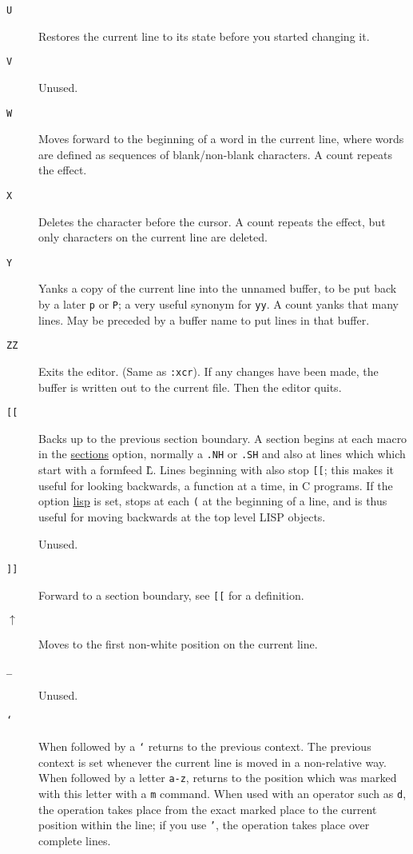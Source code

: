 \begin{description}
\item[{\tt U}] Restores the current line to its state before you started
changing it.

\item[{\tt V}] Unused.

\item[{\tt W}] Moves forward to the beginning of a word in the current line,
where words are defined as sequences of blank/non-blank characters. A count
repeats the effect.

\item[{\tt X}] Deletes the character before the cursor. A count repeats the
effect, but only characters on the current line are deleted.

\item[{\tt Y}] Yanks a copy of the current line into the unnamed buffer, to be
put back by a later {\tt p} or {\tt P}; a very useful synonym for {\tt yy}. A
count yanks that many lines. May be preceded by a buffer name to put lines in
that buffer.

\item[{\tt ZZ}] Exits the editor. (Same as {\tt :x\sc cr}). If any changes
have been made, the buffer is written out to the current file. Then the editor
quits.

\item[{\tt [[}] Backs up to the previous section boundary. A section begins at
each macro in the \ul{sections} option, normally a {\tt.NH} or {\tt.SH} and
also at lines which which start with a formfeed \^{L}.  Lines beginning with
{\tt{}} also stop {\tt [[}; this makes it useful for looking
backwards, a function at a time, in C programs. If the option \ul{lisp} is
set, stops at each {\tt (} at the beginning of a line, and is thus useful for
moving backwards at the top level LISP objects.

\item[{\tt{}}] Unused.

\item[{\tt ]]}] Forward to a section boundary, see {\tt [[} for a definition.

\item[{\tt $\uparrow$}] Moves to the first non-white position on the current
line.

\item[{\tt\_}] Unused.

\item[{\tt `}] When followed by a {\tt `} returns to the previous context. The
previous context is set whenever the current line is moved in a non-relative
way. When followed by a letter {\tt a-z}, returns to the position which was
marked with this letter with a {\tt m} command. When used with an operator
such as {\tt d}, the operation takes place from the exact marked place to the
current position within the line; if you use {\tt '}, the operation takes
place over complete lines.


\end{description}
